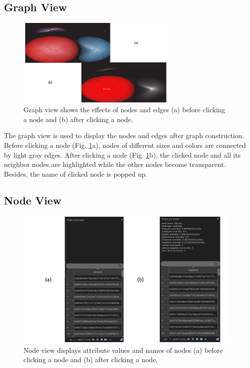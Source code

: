 \subsection{Graph View}
\label{sec:methodology:view:graph}

\begin{figure}[htb]
\includegraphics[width=0.7\textwidth]{gfx/graph-view.png}
\caption{Graph view shows the effects of nodes and edges (a) before clicking a node and (b) after clicking a node.}
\label{fig:graph-view}
\end{figure}

The graph view is used to display the nodes and edges after graph construction. Before clicking a node (Fig. \ref{fig:graph-view}a), nodes of different sizes and colors are connected by light gray edges. After clicking a node (Fig. \ref{fig:graph-view}b), the clicked node and all its neighbor nodes are highlighted while the other nodes become transparent. Besides, the name of clicked node is popped up.

\subsection{Node View}
\label{sec:methodology:view:node}

\begin{figure}[htb]
\includegraphics[width=\textwidth]{gfx/node-view.png}
\caption{Node view displays attribute values and names of nodes (a) before clicking a node and (b) after clicking a node.}
\label{fig:node-view}
\end{figure}

